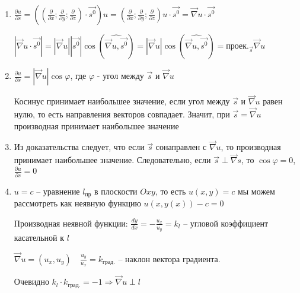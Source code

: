 \documentclass[12pt]{article}
\begin{document}
    \begin{enumerate}
        \item \begin{MyProof}
            $\frac{\partial u}{\partial s} = \left(\left(\frac{\partial}{\partial x}; \frac{\partial}{\partial y}; \frac{\partial}{\partial z}\right) \cdot \vec{s^0}\right) u = \left(\frac{\partial}{\partial x}; \frac{\partial}{\partial y}; \frac{\partial}{\partial z}\right) u \cdot \vec{s^0} =
            \vec\nabla u \cdot \vec{s^0}$
            
            $|\vec\nabla u \cdot \vec{s^0}| = |\vec\nabla u| |\vec{s^0}| \cos(\widehat{\vec\nabla u, \vec{s^0}}) =
            |\vec\nabla u| \cos(\widehat{\vec\nabla u, \vec{s^0}}) = \text{проек.}_{\vec{s}} \vec\nabla u$
        \end{MyProof}

        \item \begin{MyProof}
            $\frac{\partial u}{\partial s} = |\vec\nabla u| \cos\varphi$, где $\varphi$ - угол между $\vec{s}$ и $\vec\nabla u$

            Косинус принимает наибольшее значение, если угол между $\vec{s}$ и $\vec\nabla u$ равен нулю, то есть направления векторов совпадает. Значит, при $\vec{s} = \vec\nabla u$ производная принимает наибольшее значение
        \end{MyProof}

        \item \begin{MyProof}
            Из доказательства  следует, что если $\vec{s}$ сонаправлен с $\vec\nabla u$, то производная принимает наибольшее значение. Следовательно, если $\vec{s} \perp \vec\nabla s$, то $\cos\varphi = 0$, $\frac{\partial u}{\partial s} = 0$
        \end{MyProof}

        \item \begin{MyProof}
            $u = c$ -- уравнение $l_{\text{пр}}$ в плоскости $Oxy$, то есть $u(x, y) = c$ мы можем рассмотреть как неявную функцию $u(x, y(x)) - c = 0$

            Производная неявной функции: $\frac{dy}{dx} = -\frac{u_x}{u_y} = k_l$ -- угловой коэффициент касательной к $l$

            $\vec\nabla u = (u_x, u_y) \quad \frac{u_y}{u_x} = k_{\text{град.}}$ -- наклон вектора градиента.

            Очевидно $k_l \cdot k_{\text{град.}} = -1 \Longrightarrow \vec\nabla u \perp l$
        \end{MyProof}
    \end{enumerate}
\end{document}
